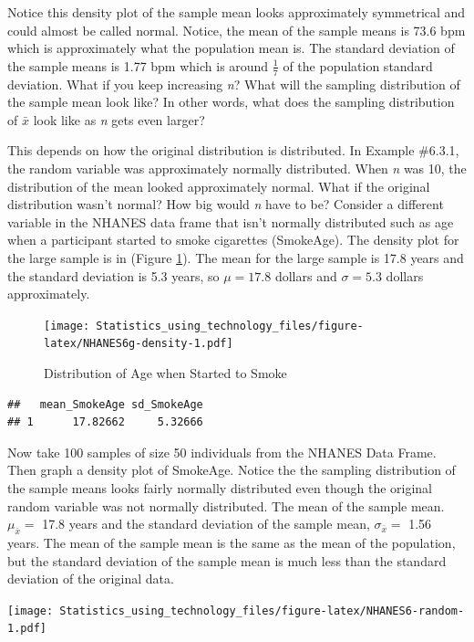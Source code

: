 \documentclass[
]{book}
\begin{document}
Notice this density plot of the sample mean looks approximately symmetrical and could almost be called normal. Notice, the mean of the sample means is 73.6 bpm which is approximately what the population mean is. The standard deviation of the sample means is 1.77 bpm which is around \(\frac{1}{7}\) of the population standard deviation. What if you keep increasing \emph{n}? What will the sampling distribution of the sample mean look like? In other words, what does the sampling distribution of \(\bar{x}\) look like as \emph{n} gets even larger?

This depends on how the original distribution is distributed. In Example \#6.3.1, the random variable was approximately normally distributed. When \emph{n} was 10, the distribution of the mean looked approximately normal. What if the original distribution wasn't normal? How big would \emph{n} have to be? Consider a different variable in the NHANES data frame that isn't normally distributed such as age when a participant started to smoke cigarettes (SmokeAge). The density plot for the large sample is in (Figure \ref{fig:NHANES6g-density}). The mean for the large sample is 17.8 years and the standard deviation is 5.3 years, so \(\mu=17.8\) dollars and \(\sigma=5.3\) dollars approximately.



\begin{figure}
\centering
\texttt{[image: Statistics\_using\_technology\_files/figure-latex/NHANES6g-density-1.pdf]}
\caption{\label{fig:NHANES6g-density}Distribution of Age when Started to Smoke}
\end{figure}

\begin{verbatim}
##   mean_SmokeAge sd_SmokeAge
## 1      17.82662     5.32666
\end{verbatim}

Now take 100 samples of size 50 individuals from the NHANES Data Frame. Then graph a density plot of SmokeAge. Notice the the sampling distribution of the sample means looks fairly normally distributed even though the original random variable was not normally distributed. The mean of the sample mean. \(\mu_{ \bar{x}}=\) 17.8 years and the standard deviation of the sample mean, \(\sigma_{\bar{x}}=\) 1.56 years. The mean of the sample mean is the same as the mean of the population, but the standard deviation of the sample mean is much less than the standard deviation of the original data.

\texttt{[image: Statistics\_using\_technology\_files/figure-latex/NHANES6-random-1.pdf]}
\end{document}
